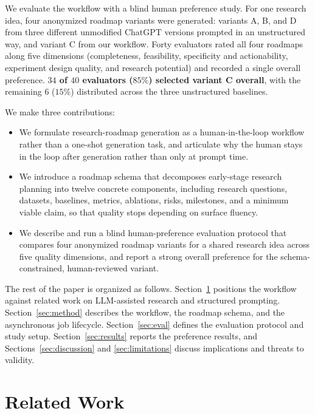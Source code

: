 \documentclass{article}
\begin{document}
We evaluate the workflow with a blind human preference study. For one
research idea, four anonymized roadmap variants were generated:
variants A, B, and D from three different unmodified ChatGPT versions
prompted in an unstructured way, and variant C from our workflow.
Forty evaluators rated all four roadmaps along five dimensions
(completeness, feasibility, specificity and actionability, experiment
design quality, and research potential) and recorded a single overall
preference. \textbf{$34$ of $40$ evaluators ($85\%$) selected variant C
overall}, with the remaining $6$ ($15\%$) distributed across the three
unstructured baselines.

We make three contributions:
\begin{itemize}
    \item We formulate research-roadmap generation as a
    human-in-the-loop workflow rather than a one-shot generation task,
    and articulate why the human stays in the loop after generation
    rather than only at prompt time.
    \item We introduce a roadmap schema that decomposes early-stage
    research planning into twelve concrete components, including
    research questions, datasets, baselines, metrics, ablations, risks,
    milestones, and a minimum viable claim, so that quality stops
    depending on surface fluency.
    \item We describe and run a blind human-preference evaluation
    protocol that compares four anonymized roadmap variants for a
    shared research idea across five quality dimensions, and report a strong overall
    preference for the schema-constrained, human-reviewed variant.
\end{itemize}

The rest of the paper is organized as follows.
Section~\ref{sec:related} positions the workflow against related work on
LLM-assisted research and structured prompting.
Section~\ref{sec:method} describes the workflow, the roadmap schema, and
the asynchronous job lifecycle.
Section~\ref{sec:eval} defines the evaluation protocol and study setup.
Section~\ref{sec:results} reports the preference results, and
Sections~\ref{sec:discussion} and \ref{sec:limitations} discuss
implications and threats to validity.

\section{Related Work}
\label{sec:related}
\end{document}
